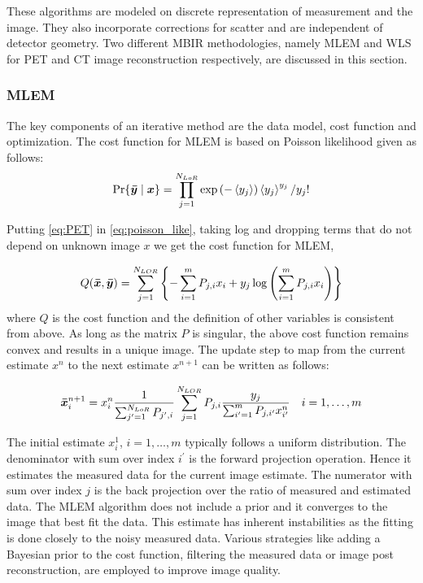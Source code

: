 These algorithms are modeled on discrete representation of measurement and the image. They also incorporate corrections for scatter and are independent of detector geometry. Two different \ac{MBIR} methodologies, namely \ac{MLEM} and \ac{WLS} for \ac{PET} and \ac{CT} image reconstruction respectively, are discussed in this section. 
\subsubsection{\ac{MLEM}}
The key components of an iterative method are the data model, cost function and optimization. The cost function for \ac{MLEM} is based on Poisson likelihood given as follows:
\begin{equation}\label{eq:poisson_like}
\operatorname{Pr}\{\bm{\bar{y}} \mid \bm{x}\}=\prod_{j=1}^{N_{L o R}} \exp \left(-\left\langle y_{j}\right\rangle\right)\left\langle y_{j}\right\rangle^{y_{j}} / y_{j} !
\end{equation}

Putting \ref{eq:PET} in \ref{eq:poisson_like}, taking log and dropping terms that do not depend on unknown image $x$ we get the cost function for \ac{MLEM},

\begin{equation}
Q(\bm{\bar{x}}, \bm{\bar{y}})=\sum_{j=1}^{N_{L O R}}\left\{-\sum_{i=1}^{m} P_{j, i} x_{i}+y_{j} \log \left(\sum_{i=1}^{m} P_{j, i} x_{i}\right)\right\}
\end{equation}
where $Q$ is the cost function and the definition of other variables is consistent from above. As long as the matrix $P$ is singular, the above cost function remains convex and results in a unique image. 
The update step to map from the current estimate $x^{n}$ to the next estimate $x^{n+1}$ can be written as follows:

\begin{equation}
\bm{\bar{x}}_{i}^{n+1}=x_{i}^{n} \frac{1}{\sum_{j^{\prime}=1}^{N_{L o R}} P_{j^{\prime}, i}} \sum_{j=1}^{N_{L O R}} P_{j, i} \frac{y_{j}}{\sum_{i^{\prime}=1}^{m} P_{j, i^{\prime}} x_{i^{\prime}}^{n}} \quad i=1, \ldots, m
\end{equation}

The initial estimate $x_i^{1}$, $i=1, \ldots, m$ typically follows a uniform distribution. The denominator with sum over index $i^{\prime}$ is the forward projection operation. Hence it estimates the measured data for the current image estimate. The numerator with sum over index $j$ is the back projection over the ratio of measured and estimated data. The \ac{MLEM} algorithm does not include a prior and it converges to the image that best fit the data. This estimate has inherent instabilities as the fitting is done closely to the noisy measured data. Various strategies like adding a Bayesian prior to the cost function, filtering the measured data or image post reconstruction, are employed to improve image quality. 

